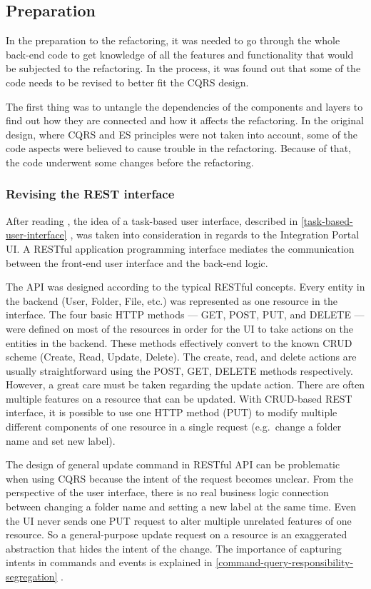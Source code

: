 \documentclass{book}
\begin{document}
\subsection{Preparation}\label{preparation}

In the preparation to the refactoring, it was needed to go through the
whole back-end code to get knowledge of all the features and
functionality that would be subjected to the refactoring. In the
process, it was found out that some of the code needs to be revised to
better fit the CQRS design.

The first thing was to untangle the dependencies of the components and
layers to find out how they are connected and how it affects the
refactoring. In the original design, where CQRS and ES principles were
not taken into account, some of the code aspects were believed to cause
trouble in the refactoring. Because of that, the code underwent some
changes before the refactoring.

\subsubsection{Revising the REST
interface}\label{revising-the-rest-interface}

After reading \cite{journey}, the idea of a task-based user interface,
described in \ref{task-based-user-interface}
, was taken into consideration in
regards to the Integration Portal UI. A RESTful application programming
interface mediates the communication between the front-end user
interface and the back-end logic.

The API was designed according to the typical RESTful concepts. Every
entity in the backend (User, Folder, File, etc.) was represented as one
resource in the interface. The four basic HTTP methods --- GET, POST,
PUT, and DELETE --- were defined on most of the resources in order for
the UI to take actions on the entities in the backend. These methods
effectively convert to the known CRUD scheme (Create, Read, Update,
Delete). The create, read, and delete actions are usually
straightforward using the POST, GET, DELETE methods respectively.
However, a great care must be taken regarding the update action. There
are often multiple features on a resource that can be updated. With
CRUD-based REST interface, it is possible to use one HTTP method (PUT)
to modify multiple different components of one resource in a single
request (e.g.~change a folder name and set new label).

The design of general update command in RESTful API can be problematic
when using CQRS because the intent of the request becomes unclear. From
the perspective of the user interface, there is no real business logic
connection between changing a folder name and setting a new label at the
same time. Even the UI never sends one PUT request to alter multiple
unrelated features of one resource. So a general-purpose update request
on a resource is an exaggerated abstraction that hides the intent of the
change. The importance of capturing intents in commands and events is
explained in \ref{command-query-responsibility-segregation}
.
\end{document}
